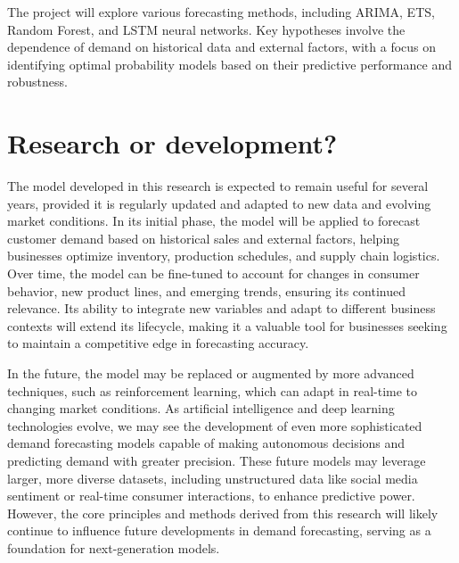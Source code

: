 \documentclass[12pt]{article}
\begin{document}
The project will explore various forecasting methods, including ARIMA, ETS, Random Forest, and LSTM neural networks. Key hypotheses involve the dependence of demand on historical data and external factors, with a focus on identifying optimal probability models based on their predictive performance and robustness.


\section{Research or development?}
The model developed in this research is expected to remain useful for several years, provided it is regularly updated and adapted to new data and evolving market conditions. In its initial phase, the model will be applied to forecast customer demand based on historical sales and external factors, helping businesses optimize inventory, production schedules, and supply chain logistics. Over time, the model can be fine-tuned to account for changes in consumer behavior, new product lines, and emerging trends, ensuring its continued relevance. Its ability to integrate new variables and adapt to different business contexts will extend its lifecycle, making it a valuable tool for businesses seeking to maintain a competitive edge in forecasting accuracy.

In the future, the model may be replaced or augmented by more advanced techniques, such as reinforcement learning, which can adapt in real-time to changing market conditions. As artificial intelligence and deep learning technologies evolve, we may see the development of even more sophisticated demand forecasting models capable of making autonomous decisions and predicting demand with greater precision. These future models may leverage larger, more diverse datasets, including unstructured data like social media sentiment or real-time consumer interactions, to enhance predictive power. However, the core principles and methods derived from this research will likely continue to influence future developments in demand forecasting, serving as a foundation for next-generation models.

%
%
\end{document}
